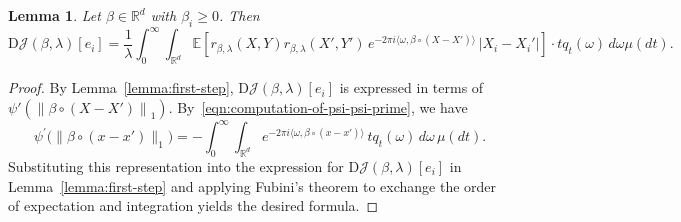 \documentclass[sn-mathphys-num]{sn-jnl}%
\numberwithin{equation}{section}
\newcommand{\R}{\mathbb{R}}
\newcommand{\E}{\mathbb{E}}
\newcommand{\norm}[1]{\left\|{#1}\right\|} %
\newtheorem{lemma}{Lemma}
\newcommand{\profile}{\psi}
\theoremstyle{thmstyleone}%
\theoremstyle{thmstyletwo}%
\theoremstyle{thmstylethree}%
\begin{document}
\vspace{.5em} 
\begin{lemma}
\label{lemma:integral-representation-of-derivative}
Let $\beta \in \R^d$ with $\beta_i \ge 0$. Then
\[
\mathrm{D}\mathcal{J}(\beta, \lambda)[e_i] = 
\frac{1}{\lambda} \int_0^\infty \int_{\R^d} 
\E\left[ r_{\beta, \lambda}(X, Y) r_{\beta, \lambda}(X', Y') \, 
e^{-2\pi i \langle \omega, \beta \circ (X - X') \rangle} 
\, |X_i - X_i'| \right] 
\cdot t q_t(\omega) \, d\omega  \mu(dt).
\]
\end{lemma}

\begin{proof}
By Lemma~\ref{lemma:first-step}, $\mathrm{D}\mathcal{J}(\beta,\lambda)[e_i]$ is expressed in terms of $\profile'(\norm{\beta \circ (X-X')}_{1})$. By~\eqref{eqn:computation-of-psi-psi-prime}, we have
\begin{equation*}
\profile^\prime\big(\|\beta \circ (x-x')\|_1\big)
= -\int_0^\infty \int_{\R^d} 
e^{-2\pi i \langle \omega, \beta \circ (x-x') \rangle} 
\, tq_t(\omega) \, d\omega \, \mu(dt).
\end{equation*}
Substituting this representation into the expression for $\mathrm{D}\mathcal{J}(\beta,\lambda)[e_i]$ in Lemma~\ref{lemma:first-step} and applying Fubini’s theorem to exchange the order of expectation and integration yields the desired formula.
\end{proof} 
\end{document}
